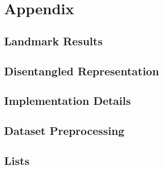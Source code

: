 \documentclass[
	  paper    = a4,
	  BCOR     = 10mm,
	  twoside,
	  fontsize = 12pt,
	  fleqn,
	  toc      = bibnumbered,
	  toc      = listofnumbered,
	  numbers  = noendperiod,
	  headings = normal,
	  listof   = leveldown,
	  version  = 3.03
	]{scrreprt}
\begin{document}
	

	\tableofcontents
	\newpage
	
	
	
	
	
	
	

	\part{Appendix}
	\begin{appendix}
	\chapter{Landmark Results}
	
	\chapter{Disentangled Representation}
	
	\chapter{Implementation Details}
	
	\chapter{Dataset Preprocessing}
	
	\chapter{Lists}
	\listoffigures
	\listoftables
	{}
	
	
	\end{appendix}
	
\end{document}
